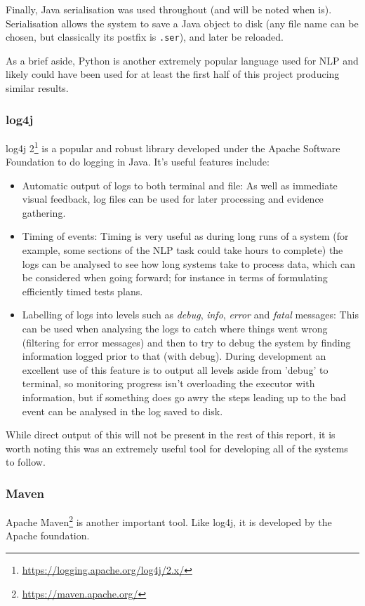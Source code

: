 Finally, Java serialisation was used throughout (and will be noted when is). Serialisation allows the system to save a Java object to disk (any file name can be chosen, but classically its postfix is \texttt{.ser}), and later be reloaded. 

As a brief aside, Python is another extremely popular language used for NLP and likely could have been used for at least the first half of this project producing similar results.

\subsubsection*{log4j}
log4j 2\footnote{\href{https://logging.apache.org/log4j/2.x/}{https://logging.apache.org/log4j/2.x/}} is a popular and robust library developed under the Apache Software Foundation to do logging in Java. It's useful features include:
\begin{itemize}
	\item Automatic output of logs to both terminal and file: As well as immediate visual feedback, log files can be used for later processing and evidence gathering.
	\item Timing of events: Timing is very useful as during long runs of a system (for example, some sections of the NLP task could take hours to complete) the logs can be analysed to see how long systems take to process data, which can be considered when going forward; for instance in terms of formulating efficiently timed tests plans.
	\item Labelling of logs into levels such as \textit{debug}, \textit{info}, \textit{error} and \textit{fatal} messages: This can be used when analysing the logs to catch where things went wrong (filtering for error messages) and then to try to debug the system by finding information logged prior to that (with debug). During development an excellent use of this feature is to output all levels aside from 'debug' to terminal, so monitoring progress isn't overloading the executor with information, but if something does go awry the steps leading up to the bad event can be analysed in the log saved to disk.
\end{itemize}

While direct output of this will not be present in the rest of this report, it is worth noting this was an extremely useful tool for developing all of the systems to follow. 

\subsubsection*{Maven}
Apache Maven\footnote{\href{https://maven.apache.org/}{https://maven.apache.org/}} is another important tool. Like log4j, it is developed by the Apache foundation. 

